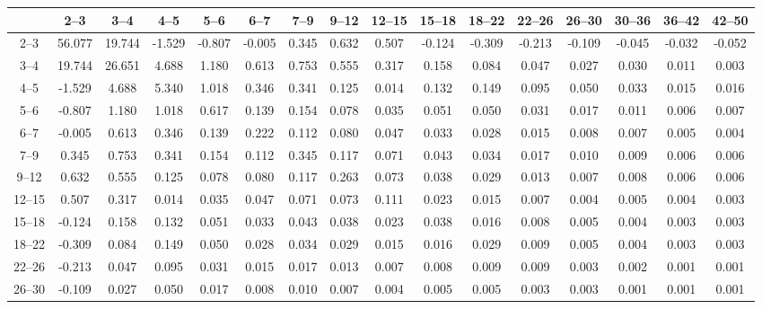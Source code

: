 \begin{table}[tb]
    {\renewcommand{\tabcolsep}{0.1cm} \begin{tabular}{c|ccccccccccccccc}
    \hline
           &   2--3 &   3--4 &   4--5 &   5--6 &   6--7 &   7--9 &  9--12 & 12--15 & 15--18 & 18--22 & 22--26 & 26--30 & 30--36 & 36--42 & 42--50 \\
    \hline
    2--3   & 56.077 & 19.744 & -1.529 & -0.807 & -0.005 &  0.345 &  0.632 &  0.507 & -0.124 & -0.309 & -0.213 & -0.109 & -0.045 & -0.032 & -0.052 \\
    3--4   & 19.744 & 26.651 &  4.688 &  1.180 &  0.613 &  0.753 &  0.555 &  0.317 &  0.158 &  0.084 &  0.047 &  0.027 &  0.030 &  0.011 &  0.003 \\
    4--5   & -1.529 &  4.688 &  5.340 &  1.018 &  0.346 &  0.341 &  0.125 &  0.014 &  0.132 &  0.149 &  0.095 &  0.050 &  0.033 &  0.015 &  0.016 \\
    5--6   & -0.807 &  1.180 &  1.018 &  0.617 &  0.139 &  0.154 &  0.078 &  0.035 &  0.051 &  0.050 &  0.031 &  0.017 &  0.011 &  0.006 &  0.007 \\
    6--7   & -0.005 &  0.613 &  0.346 &  0.139 &  0.222 &  0.112 &  0.080 &  0.047 &  0.033 &  0.028 &  0.015 &  0.008 &  0.007 &  0.005 &  0.004 \\
    7--9   &  0.345 &  0.753 &  0.341 &  0.154 &  0.112 &  0.345 &  0.117 &  0.071 &  0.043 &  0.034 &  0.017 &  0.010 &  0.009 &  0.006 &  0.006 \\
    9--12  &  0.632 &  0.555 &  0.125 &  0.078 &  0.080 &  0.117 &  0.263 &  0.073 &  0.038 &  0.029 &  0.013 &  0.007 &  0.008 &  0.006 &  0.006 \\
    12--15 &  0.507 &  0.317 &  0.014 &  0.035 &  0.047 &  0.071 &  0.073 &  0.111 &  0.023 &  0.015 &  0.007 &  0.004 &  0.005 &  0.004 &  0.003 \\
    15--18 & -0.124 &  0.158 &  0.132 &  0.051 &  0.033 &  0.043 &  0.038 &  0.023 &  0.038 &  0.016 &  0.008 &  0.005 &  0.004 &  0.003 &  0.003 \\
    18--22 & -0.309 &  0.084 &  0.149 &  0.050 &  0.028 &  0.034 &  0.029 &  0.015 &  0.016 &  0.029 &  0.009 &  0.005 &  0.004 &  0.003 &  0.003 \\
    22--26 & -0.213 &  0.047 &  0.095 &  0.031 &  0.015 &  0.017 &  0.013 &  0.007 &  0.008 &  0.009 &  0.009 &  0.003 &  0.002 &  0.001 &  0.001 \\
    26--30 & -0.109 &  0.027 &  0.050 &  0.017 &  0.008 &  0.010 &  0.007 &  0.004 &  0.005 &  0.005 &  0.003 &  0.003 &  0.001 &  0.001 &  0.001 \\

\end{tabular}}
\end{table}
